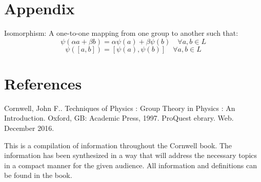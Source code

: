 \documentclass{article}
\begin{document}
\section{Appendix}
Isomorphism: A one-to-one mapping from one group to another such that:
\begin{equation}
\psi(\alpha a + \beta b) = \alpha\psi (a) + \beta\psi (b) \quad \forall a, b \in L
\end{equation}
\begin{equation}
\psi([a, b]) = [\psi (a), \psi (b)] \quad \forall a, b \in L
\end{equation}



\section{References}
Cornwell, John F.. Techniques of Physics : Group Theory in Physics : An Introduction. Oxford, GB: Academic Press, 1997. ProQuest ebrary. Web. December 2016.


This is a compilation of information throughout the Cornwell book. The information has been synthesized in a way that will address the necessary topics in a compact manner for the given audience. All information and definitions can be found in the book.
\end{document}
